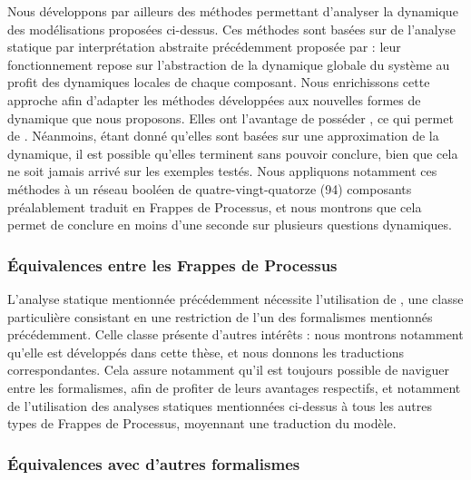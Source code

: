 Nous développons par ailleurs des méthodes permettant d'analyser la dynamique
des modélisations proposées ci-dessus.
Ces méthodes sont basées sur de l'analyse statique par interprétation abstraite
précédemment proposée par  :
leur fonctionnement repose sur l'abstraction de la dynamique globale du système
au profit des dynamiques locales de chaque composant.
Nous enrichissons cette approche afin d'adapter les méthodes développées
aux nouvelles formes de dynamique que nous proposons.
Elles ont l'avantage de posséder ,
ce qui permet de .
Néanmoins, étant donné qu'elles sont basées sur une approximation de la dynamique,
il est possible qu'elles terminent sans pouvoir conclure,
bien que cela ne soit jamais arrivé sur les exemples testés.
Nous appliquons notamment ces méthodes à un réseau booléen de quatre-vingt-quatorze (94) composants
préalablement traduit en Frappes de Processus,
et nous montrons que cela permet de conclure
en moins d'une seconde sur plusieurs questions dynamiques.

\subsubsection*{Équivalences entre les Frappes de Processus}

L'analyse statique mentionnée précédemment nécessite l'utilisation
de ,
une classe particulière
consistant en une restriction de l'un des formalismes mentionnés précédemment.
Celle classe présente d'autres intérêts :
nous montrons notamment qu'elle est
 développés dans cette thèse,
et nous donnons les traductions correspondantes.
Cela assure notamment qu'il est toujours possible de naviguer entre les formalismes,
afin de profiter de leurs avantages respectifs,
et notamment de l'utilisation des analyses statiques mentionnées ci-dessus
à tous les autres types de Frappes de Processus, moyennant une traduction du modèle.

\subsubsection*{Équivalences avec d'autres formalismes}

